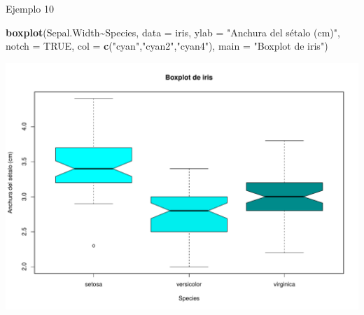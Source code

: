 \documentclass[
  ignorenonframetext,
]{beamer}
\newenvironment{Shaded}{\begin{snugshade}}{\end{snugshade}}
\newcommand{\AttributeTok}[1]{\textcolor[rgb]{0.13,0.29,0.53}{#1}}
\newcommand{\ConstantTok}[1]{\textcolor[rgb]{0.56,0.35,0.01}{#1}}
\newcommand{\FunctionTok}[1]{\textcolor[rgb]{0.13,0.29,0.53}{\textbf{#1}}}
\newcommand{\NormalTok}[1]{#1}
\newcommand{\SpecialCharTok}[1]{\textcolor[rgb]{0.81,0.36,0.00}{\textbf{#1}}}
\newcommand{\StringTok}[1]{\textcolor[rgb]{0.31,0.60,0.02}{#1}}
\begin{document}
\begin{frame}[fragile]{Ejemplo 10}
\label{ejemplo-10}
\begin{Shaded}
\begin{Highlighting}[]
\FunctionTok{boxplot}\NormalTok{(Sepal.Width}\SpecialCharTok{\textasciitilde{}}\NormalTok{Species, }\AttributeTok{data =}\NormalTok{ iris, }\AttributeTok{ylab =} \StringTok{"Anchura del sétalo (cm)"}\NormalTok{,}
        \AttributeTok{notch =} \ConstantTok{TRUE}\NormalTok{, }\AttributeTok{col =} \FunctionTok{c}\NormalTok{(}\StringTok{"cyan"}\NormalTok{,}\StringTok{"cyan2"}\NormalTok{,}\StringTok{"cyan4"}\NormalTok{),}
        \AttributeTok{main =} \StringTok{"Boxplot de iris"}\NormalTok{)}
\end{Highlighting}
\end{Shaded}

\includegraphics[width=0.8\linewidth]{R_base_files/figure-beamer/unnamed-chunk-191-1}
\end{frame}
\end{document}
